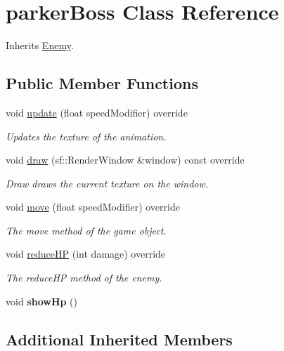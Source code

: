 \hypertarget{classparker_boss}{\section{parker\+Boss Class Reference}
\label{classparker_boss}
}


Inherits \hyperlink{class_enemy}{Enemy}.

\subsection*{Public Member Functions}
\begin{DoxyCompactItemize}
\item 
void \hyperlink{classparker_boss_a5f82194f8880924981fccd4bf611f324}{update} (float speed\+Modifier) override
\begin{DoxyCompactList}\small\item\em Updates the texture of the animation. \end{DoxyCompactList}\item 
void \hyperlink{classparker_boss_a58e7adcdd65c22eeaff3ef4185722417}{draw} (sf\+::\+Render\+Window \&window) const override
\begin{DoxyCompactList}\small\item\em Draw draws the current texture on the window. \end{DoxyCompactList}\item 
void \hyperlink{classparker_boss_a92a6a7944dcd26818dcfee1701e4a41b}{move} (float speed\+Modifier) override
\begin{DoxyCompactList}\small\item\em The move method of the game object. \end{DoxyCompactList}\item 
void \hyperlink{classparker_boss_a8ada14e4fa55fe77c905ed28f07c650e}{reduce\+H\+P} (int damage) override
\begin{DoxyCompactList}\small\item\em The reduce\+H\+P method of the enemy. \end{DoxyCompactList}\item 
\hypertarget{classparker_boss_a52928b2641e7da080fd27b2f9679aa26}{void {\bfseries show\+Hp} ()}\label{classparker_boss_a52928b2641e7da080fd27b2f9679aa26}

\end{DoxyCompactItemize}
\subsection*{Additional Inherited Members}



